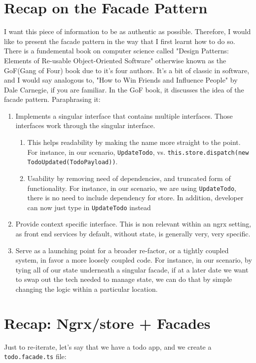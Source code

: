 \section{Recap on the Facade Pattern}
I want this piece of information to be as authentic as possible. Therefore, I would like to present the facade pattern in the way that I first learnt how to do so. There is a fundemental book on computer science called "Design Patterns: Elements of Re-usable Object-Oriented Software" otherwise known as the GoF(Gang of Four) book due to it's four authors. It's a bit of classic in software, and I would say analogous to, "How to Win Friends and Influence People" by Dale Carnegie, if you are familiar. In the GoF book, it discusses the idea of the facade pattern. Paraphrasing it: 
\begin{enumerate}
  \item Implements a singular interface that contains multiple interfaces. Those interfaces work through the singular interface.
  \begin{enumerate}
    \item This helps readability by making the name more straight to the point. For instance, in our scenario, \lstinline{UpdateTodo}, vs. \lstinline{this.store.dispatch(new TodoUpdated(TodoPayload))}. 
    \item Usability by removing need of dependencies, and truncated form of functionality. For instance, in our scenario, we are using \lstinline{UpdateTodo}, there is no need to include dependency for store. In addition, developer can now just type in \lstinline{UpdateTodo} instead 
  \end{enumerate}
  \item Provide context specific interface. This is non relevant within an ngrx setting, as front end services by default, without state, is generally very, very specific.
  \item Serve as a launching point for a broader re-factor, or a tightly coupled system, in favor a more loosely coupled code. For instance, in our scenario, by tying all of our state underneath a singular facade, if at a later date we want to swap out the tech needed to manage state, we can do that by simple changing the logic within a particular location. 
\end{enumerate}

\section{Recap: Ngrx/store + Facades}
Just to re-iterate, let's say that we have a todo app, and we create a \lstinline{todo.facade.ts} file:

